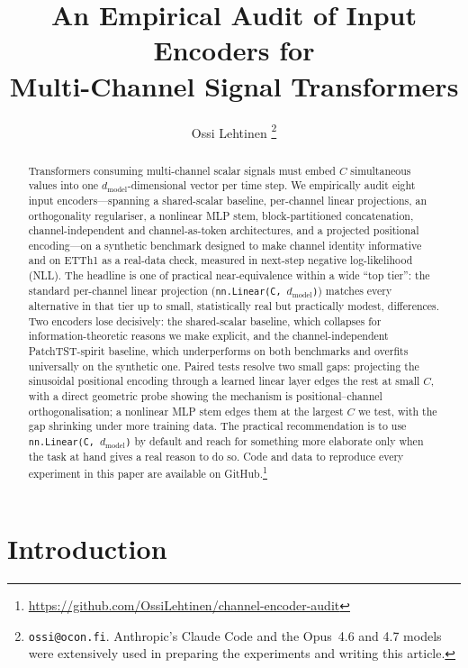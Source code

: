 \documentclass[11pt]{article}
\title{An Empirical Audit of Input Encoders for\\
       Multi-Channel Signal Transformers}
\author{Ossi Lehtinen%
  \thanks{\texttt{ossi@ocon.fi}.
    Anthropic's Claude Code and the Opus~4.6 and 4.7 models were
    extensively used in preparing the experiments and writing this
    article.}}
\affil{Ocon Oy}
\date{}
\begin{document}
\maketitle

\begin{abstract}
Transformers consuming multi-channel scalar signals must embed $C$
simultaneous values into one $d_{\text{model}}$-dimensional vector
per time step. We empirically audit eight input encoders---spanning
a shared-scalar baseline, per-channel linear projections, an
orthogonality regulariser, a nonlinear MLP stem, block-partitioned
concatenation, channel-independent and channel-as-token
architectures, and a projected positional encoding---on a synthetic
benchmark designed to make channel identity informative and on
ETTh1 as a real-data check, measured in
next-step negative log-likelihood (NLL). The headline is one of
practical near-equivalence within a wide ``top tier'': the
standard per-channel linear projection
(\texttt{nn.Linear(C, $d_{\text{model}}$)}) matches every
alternative in that tier up to small, statistically real but
practically modest, differences. Two encoders lose decisively: the
shared-scalar baseline, which collapses for information-theoretic
reasons we make explicit, and the channel-independent
PatchTST-spirit baseline, which underperforms on both benchmarks
and overfits universally on the synthetic one. Paired tests resolve two small gaps:
projecting the sinusoidal positional encoding through a learned
linear layer edges the rest at small $C$, with a direct geometric
probe showing the mechanism is positional--channel
orthogonalisation; a nonlinear MLP stem edges them at the largest
$C$ we test, with the gap shrinking under more training data. The
practical recommendation is to use
\texttt{nn.Linear(C, $d_{\text{model}}$)} by default and reach for
something more elaborate only when the task at hand gives a real
reason to do so. Code and data to reproduce every experiment in this
paper are available on GitHub.\footnote{\url{https://github.com/OssiLehtinen/channel-encoder-audit}}
\end{abstract}

\section{Introduction}
\end{document}
